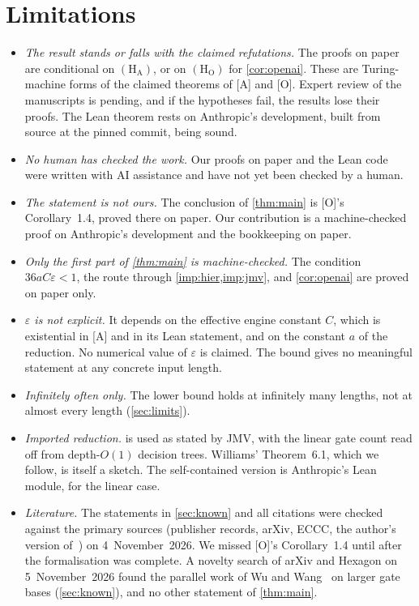 \documentclass[10pt]{amsart}
\theoremstyle{plain}
\theoremstyle{definition}
\theoremstyle{remark}
\numberwithin{equation}{section}
\newcommand{\A}{\textup{[A]}}
\newcommand{\Oa}{\textup{[O]}}
\begin{document}
\section{Limitations}\label{sec:limitations}

\begin{itemize}
\item \emph{The result stands or falls with the claimed refutations.} The proofs on paper are
conditional on $(\mathrm{H}_{\mathrm{A}})$, or on $(\mathrm{H}_{\mathrm{O}})$ for \cref{cor:openai}.
These are Turing-machine forms of the claimed theorems of \A{} and \Oa. Expert review of the
manuscripts is pending, and if the hypotheses fail, the results lose their proofs. The Lean theorem
rests on Anthropic's development, built from source at the pinned commit, being sound.
\item \emph{No human has checked the work.} Our proofs on paper and the Lean code were written with
AI assistance and have not yet been checked by a human.
\item \emph{The statement is not ours.} The conclusion of \cref{thm:main} is \Oa's Corollary~1.4, proved there on
paper. Our contribution is a machine-checked proof on Anthropic's development and the bookkeeping on
paper.
\item \emph{Only the first part of \cref{thm:main} is machine-checked.} The condition
$36aC\varepsilon<1$, the route through \cref{imp:hier,imp:jmv}, and \cref{cor:openai} are proved on
paper only.
\item \emph{$\varepsilon$ is not explicit.} It depends on the effective engine constant $C$,
which is existential in \A{} and in its Lean statement, and on the constant $a$ of the reduction.
No numerical value of $\varepsilon$ is claimed. The bound gives no meaningful statement at any
concrete input length.
\item \emph{Infinitely often only.} The lower bound holds at infinitely many lengths, not at almost
every length (\cref{sec:limits}).
\item \emph{Imported reduction.}  is used as stated by JMV, with the linear gate
count read off from depth-$O(1)$ decision trees. Williams' Theorem~6.1, which we follow, is itself
a sketch. The self-contained version is Anthropic's Lean module, for the linear case.
\item \emph{Literature.} The statements in \cref{sec:known} and all citations were checked against
the primary sources (publisher records, arXiv, ECCC, the author's version of~\cite{Wil13}) on
4~November~2026. We missed \Oa's Corollary~1.4 until after the formalisation was complete. A
novelty search of arXiv and Hexagon on 5~November~2026 found the parallel work of Wu and
Wang~\cite{WW26} on larger gate bases (\cref{sec:known}), and no other statement of
\cref{thm:main}.
\end{itemize}
\end{document}
